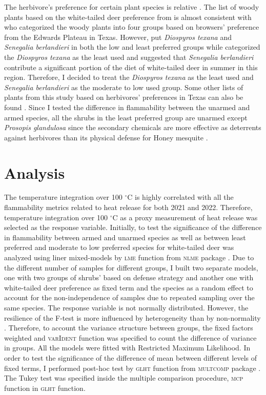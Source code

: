 \documentclass{ttuthes2007}
\newcommand{\pkg}[1]{\textsc{#1}}
\begin{document}
The herbivore’s preference for certain plant species is relative \citep{wright2003white}. The list of woody plants based on the white-tailed deer preference from \citep{wright2003white} is almost consistent with \citep{nelle1996management} who categorized the woody plants into four groups based on browsers’ preference from the Edwards Plateau in Texas. However,  \citep{wright2003white} put \emph{Diospyros texana} and \emph{Senegalia berlandieri} in both the low and least preferred groups while \citep{nelle1996management} categorized the \emph{Diospyros texana} as the least used and \citep*{varner1987southern} suggested that \emph{Senegalia berlandieri} contribute a significant portion of the diet of white-tailed deer in summer in this region.  Therefore, I decided to treat the \emph{Diospyros texana} as the least used and \emph{Senegalia berlandieri} as the moderate to low used group. Some other lists of plants from this study based on herbivores’ preferences in Texas can also be found \citep{arnold1979seasonallist, nelle2001ecological, everitt1974springfoodhabit, dillard2006whitetaileddeer}. Since I tested the difference in flammability between the unarmed and armed species, all the shrubs in the least preferred group are unarmed except \emph{Prosopis glandulosa} since the secondary chemicals are more effective as deterrents against herbivores than its physical defense for Honey mesquite \citep{wright2003white}.

\section{Analysis}
The temperature integration over 100 $^{\circ}$C is highly correlated with all the flammability metrics related to heat release for both 2021 and 2022. Therefore, temperature integration over 100 $^{\circ}$C as a proxy measurement of heat release was selected as the response variable. Initially, to test the significance of the difference in flammability between armed and unarmed species as well as between least preferred and moderate to low preferred species for white-tailed deer was analyzed using liner mixed-models by \pkg{lme} function from \pkg{nlme} package \citep{pinheiro2017package}. Due to the different number of samples for different groups, I  built two separate models, one with two groups of shrubs' based on defense strategy and another one with white-tailed deer preference as fixed term and the species as a random effect to account for the non-independence of samples due to repeated sampling over the same species. The response variable is not normally distributed. However, the resilience of the F-test is more influenced by heterogeneity than by non-normality \citep{blanca2017non}. Therefore, to account the variance structure between groups, the fixed factors weighted and \pkg{varIdent} function was specified to count the difference of variance in groups. All the models were fitted with Restricted Maximum Likelihood. In order to test the significance of the difference of mean between different levels of fixed terms, I performed post-hoc test by \pkg{glht} function from \pkg{multcomp} package \citep{hothorn2016package}. The Tukey test was specified inside the multiple comparison procedure, \pkg{mcp} function in
\pkg{glht} function.
\end{document}
